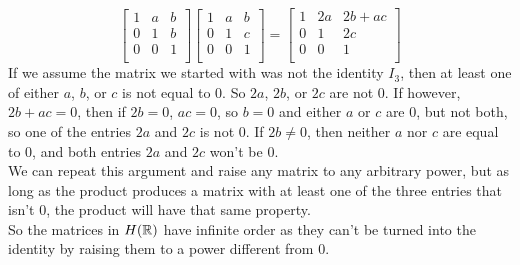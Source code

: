 \documentclass[12pt]{article}
\begin{document}
\begin{enumerate}[label=\textbf{\alph*.}]
\[\begin{bmatrix}
                1 & a & b \\
                0 & 1 & b \\
                0 & 0 & 1 \\
            \end{bmatrix}
            \begin{bmatrix}
                1 & a & b \\
                0 & 1 & c \\
                0 & 0 & 1 \\
            \end{bmatrix}
            = \begin{bmatrix}
                1 & 2a & 2b + ac \\
                0 & 1 & 2c \\
                0 & 0 & 1 \\
            \end{bmatrix} \]
            If we assume the matrix we started with was not the identity $I_3$,
            then at least one of either $a$, $b$, or $c$ is not equal to 0.
            So $2a$, $2b$, or $2c$ are not 0.
            If however, $2b + ac = 0$,
            then if $2b = 0$, $ac = 0$,
            so $b = 0$ and either $a$ or $c$ are 0, but not both,
            so one of the entries $2a$ and $2c$ is not 0.
            If $2b \neq 0$, then neither $a$ nor $c$ are equal to 0, and
            both entries $2a$ and $2c$ won't be 0. \\
            We can repeat this argument and raise any matrix to any
            arbitrary power,
            but as long as the product produces a matrix with at least one
            of the three entries that isn't 0, the product will have 
            that same property. \\
            So the matrices in $H(\mathbb{R})$ have infinite order as they can't
            be turned into the identity by raising them to a power different
            from 0. 
    \end{enumerate}
\end{document}
